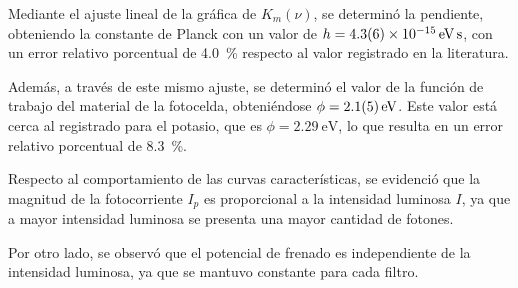 Mediante el ajuste lineal de la gráfica de \( K_{m}(\nu) \), se determinó la pendiente,
obteniendo la constante de Planck con un valor de \( h = \planckhexp \),
con un error relativo porcentual de \qty{4.0}{\percent} respecto al valor registrado en la literatura.

Además, a través de este mismo ajuste, se determinó el valor de la función de trabajo
del material de la fotocelda, obteniéndose \( \phi = \workfunctionexp \).
Este valor está cerca al registrado para el potasio, que es \( \phi = \qty{2.29}{\eV} \),
lo que resulta en un error relativo porcentual de \qty{8.3}{\percent}.

Respecto al comportamiento de las curvas características,
se evidenció que la magnitud de la fotocorriente \( I_{p} \) es proporcional a
la intensidad luminosa \( I \), ya que a mayor intensidad luminosa se presenta
una mayor cantidad de fotones.

Por otro lado, se observó que el potencial de frenado es independiente de la
intensidad luminosa, ya que se mantuvo constante para cada filtro.
